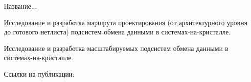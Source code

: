 \documentclass[a4paper,12pt]{report}
\begin{document}


Название...

Исследование и разработка маршрута проектирования (от архитектурного уровня до готового нетлиста) подсистем обмена данными в системах-на-кристалле.

Исследование и разработка масштабируемых подсистем обмена данными в системах-на-кристалле.



Ссылки на публикации:
 
\cite{MED01}
\cite{PYT01}
\cite{MED02}
\cite{MED03}
\cite{PYT02}
\cite{MED04}
\cite{PYT03}
\cite{MED05}
\cite{MED06}


\end{document}
